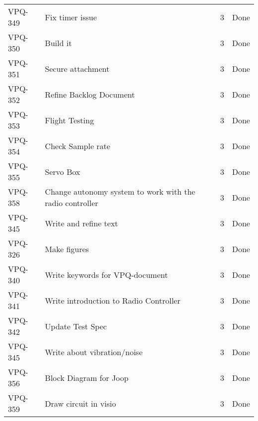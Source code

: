 \begin{table}[ht]
\begin{tabularx}{\linewidth}{|m{1.5cm} m{8.3cm} m{1.5cm} m{3.5cm}|}
      VPQ-349 & Fix timer issue & 3\centering & Done  \\
\rowcolor{gainsboro}  VPQ-350 & Build it & 3\centering & Done  \\
      VPQ-351 & Secure attachment & 3\centering & Done  \\
\rowcolor{gainsboro}  VPQ-352 & Refine Backlog Document & 3\centering & Done  \\
      VPQ-353 & Flight Testing & 3\centering & Done  \\
\rowcolor{gainsboro}  VPQ-354 & Check Sample rate & 3\centering & Done  \\
      VPQ-355 & Servo Box & 3\centering & Done  \\
\rowcolor{gainsboro}  VPQ-358 & Change autonomy system to work with the radio controller & 3\centering & Done  \\
      VPQ-345 & Write and refine text & 3\centering & Done  \\
\rowcolor{gainsboro}  VPQ-326 & Make figures & 3\centering & Done  \\
      VPQ-340 & Write keywords for VPQ-document & 3\centering & Done  \\
\rowcolor{gainsboro}  VPQ-341 & Write introduction to Radio Controller & 3\centering & Done  \\
      VPQ-342 & Update Test Spec & 3\centering & Done  \\
\rowcolor{gainsboro}  VPQ-345 & Write about vibration/noise & 3\centering & Done  \\
      VPQ-356 & Block Diagram for Joop & 3\centering & Done  \\
\rowcolor{gainsboro}  VPQ-359 & Draw circuit in visio & 3\centering & Done  \\
\hline    
\end{tabularx}
\end{table}





